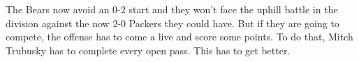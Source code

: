 \documentclass[11pt]{article}
\begin{document}
\begin{enumerate}
    \begin{minipage}{1.0\linewidth}
      The Bears now avoid an 0-2 start and they won't face the uphill battle in the division against the now 2-0 Packers they could have.  But if they are going to compete, the offense has to come a live and score some points.  To do that, Mitch Trubusky has to complete every open pass.  This has to get better.
    \end{minipage}

  \end{enumerate}
\end{document}
